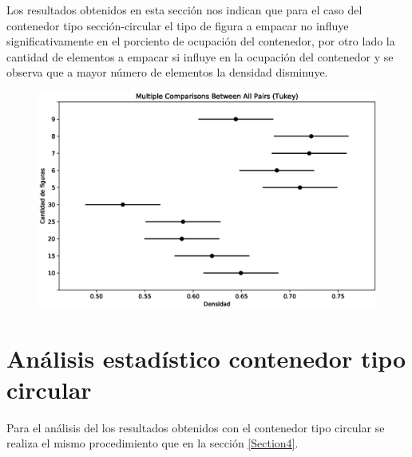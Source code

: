 \documentclass[5p,times]{elsarticle}
\begin{document}
Los resultados obtenidos en esta sección nos indican que para el caso del contenedor tipo sección-circular el tipo de figura  a empacar no influye significativamente en el porciento de ocupación del contenedor, por otro lado la cantidad de elementos a empacar si influye en la ocupación del contenedor y se observa que a mayor número de elementos la densidad disminuye.

	\begin{figure}
				\begin{center}
					\includegraphics[scale=0.42, trim=8 8 8 20, clip=true]{figuras/simultaneous_tukeyCantidad_figuras.eps}
					\label{fig:tykey1}
				\end{center}
			\end{figure}
		
\section{Análisis estadístico contenedor tipo circular} \label{Section5}

Para el análisis del los resultados obtenidos con el contenedor tipo circular se realiza el mismo procedimiento que en la sección \ref{Section4}.
\end{document}
